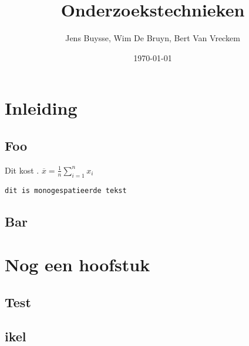\documentclass{hogent-report}
\title{Onderzoekstechnieken}
\author{Jens Buysse, Wim {De Bruyn}, Bert {Van Vreckem}}
\date{\today}
\begin{document}
  \usechapterimagefalse
  
  
  \tableofcontents
  
  \chapter{Inleiding}
  
  \lipsum[1]
  
  \section{Foo}
  
  Dit kost . $\overline{x} = \frac{1}{n} \sum_{i = 1}^{n} x_i$
  
  \texttt{dit is monogespatieerde tekst}
  
  \lipsum[2-3]
  
  \section{Bar}
  
  \lipsum[4-6]
  
  \chapter{Nog een hoofstuk}
  
  \lipsum[7]
  
  \section{Test}
  
  \lipsum[8-10]
  
  \section{ikel}
  
  \lipsum[11-15]
  
\end{document}
